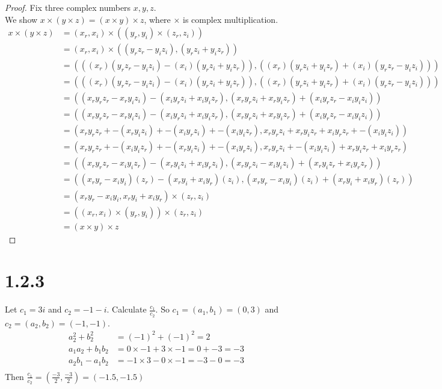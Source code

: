 \documentclass[11pt]{article}
\begin{document}
\begin{proof}
	Fix three complex numbers $x, y, z$. \\
	We show $x \times (y \times z) = (x \times y) \times z$, where $\times$ is complex multiplication.
\begin{align*}
	x \times (y \times z) &= (x_r, x_i) \times ((y_r, y_i) \times (z_r, z_i)) \\
			      &= (x_r, x_i) \times ((y_rz_r - y_iz_i), (y_rz_i + y_iz_r)) \\
			      &= (((x_r)(y_rz_r - y_iz_i) - (x_i)(y_rz_i + y_iz_r)) , ((x_r)(y_rz_i + y_iz_r) + (x_i)(y_rz_r - y_iz_i))) \\
			      &= (((x_r)(y_rz_r - y_iz_i) - (x_i)(y_rz_i + y_iz_r)) , ((x_r)(y_rz_i + y_iz_r) + (x_i)(y_rz_r - y_iz_i))) \\
			      &= ((x_ry_rz_r - x_ry_iz_i) - (x_iy_rz_i + x_iy_iz_r) , (x_ry_rz_i + x_ry_iz_r) + (x_iy_rz_r - x_iy_iz_i)) \\
			      &= ((x_ry_rz_r - x_ry_iz_i) - (x_iy_rz_i + x_iy_iz_r) , (x_ry_rz_i + x_ry_iz_r) + (x_iy_rz_r - x_iy_iz_i)) \\
			      &= (x_ry_rz_r + -(x_ry_iz_i) + -(x_iy_rz_i) + -(x_iy_iz_r) , x_ry_rz_i + x_ry_iz_r + x_iy_rz_r + -(x_iy_iz_i)) \\
			      &=  (x_ry_rz_r + -(x_iy_iz_r) + -(x_ry_iz_i) + -(x_iy_rz_i) , x_ry_rz_i + -(x_iy_iz_i) + x_ry_iz_r + x_iy_rz_r) \\
			      &=  ( (x_ry_rz_r - x_iy_iz_r) - (x_ry_iz_i + x_iy_rz_i) , (x_ry_rz_i - x_iy_iz_i) + (x_ry_iz_r + x_iy_rz_r)  ) \\
			      &=  ( (x_ry_r - x_iy_i)(z_r) - (x_ry_i + x_iy_r)(z_i) , (x_ry_r - x_iy_i)(z_i) + (x_ry_i + x_iy_r)(z_r)  ) \\
			      &= (x_ry_r - x_iy_i , x_ry_i + x_iy_r) \times (z_r,z_i) \\
			      &= ((x_r,x_i) \times (y_r,y_i)) \times (z_r,z_i) \\
			      &= (x \times y) \times z
\end{align*}

\end{proof}

\newpage 

\section{1.2.3}
Let $c_1 = 3i$ and $c_2 = -1 - i$. Calculate $\frac{c_1}{c_2}$.
So $c_1 = (a_1, b_1) = (0, 3)$ and $c_2 = (a_2, b_2) = (-1, -1)$. \\
\begin{align*}
	a_2^2 + b_2^2 &= (-1)^2 + (-1)^2 = 2 \\
	a_1a_2 + b_1b_2 &= 0 \times -1 + 3 \times -1 = 0 + -3 = -3 \\
	a_2b_1 - a_1b_2 &= -1 \times 3 - 0 \times -1 = -3 - 0 = -3 \\
\end{align*}
Then $\frac{c_1}{c_2} = (\frac{-3}{2},\frac{-3}{2}) = (-1.5, -1.5)$
\end{document}
